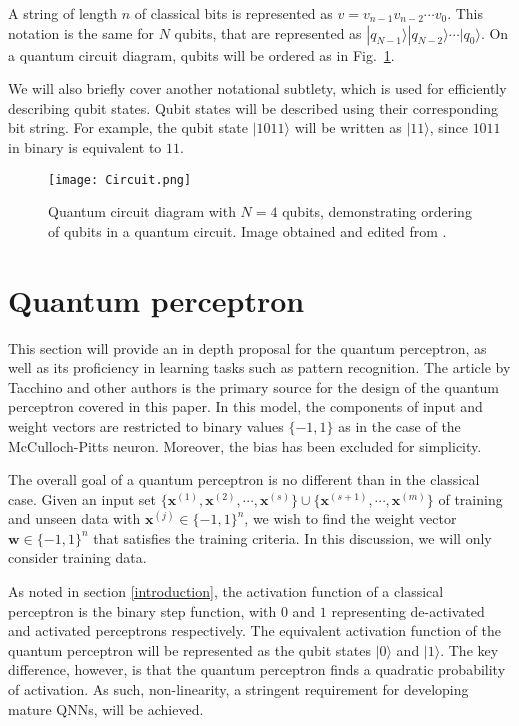\documentclass[twocolumn,superscriptaddress]{revtex4-1}
\begin{document}
A string of length $n$ of classical bits is represented as $v = v_{n-1} v_{n-2} \cdots v_0$. This notation is the same for $N$ qubits, that are represented as $|q_{N-1} \rangle | q_{N-2} \rangle \cdots |q_0 \rangle$. On a quantum circuit diagram, qubits will be ordered as in Fig.~\ref{fig:Circuit}.

We will also briefly cover another notational subtlety, which is used for efficiently describing qubit states. Qubit states will be described using their corresponding bit string. For example, the qubit state $|1011 \rangle$ will be written as $|11 \rangle$, since $1011$ in binary is equivalent to $11$.

\begin{figure}[t!]
\texttt{[image: Circuit.png]}
\caption{Quantum circuit diagram with $N = 4$ qubits, demonstrating ordering of qubits in a quantum circuit. Image obtained and edited from \cite{Inaki2024}.}
\label{fig:Circuit}
\end{figure}

\section{Quantum perceptron} \label{quantum perceptron}

This section will provide an in depth proposal for the quantum perceptron, as well as its proficiency in learning tasks such as pattern recognition. The article \cite{Tacchino_2019} by Tacchino and other authors is the primary source for the design of the quantum perceptron covered in this paper. In this model, the components of input and weight vectors are restricted to binary values $\{-1, 1\}$ as in the case of the McCulloch-Pitts neuron. Moreover, the bias has been excluded for simplicity.

The overall goal of a quantum perceptron is no different than in the classical case. Given an input set $\{\bm{x}^{(1)}, \bm{x}^{(2)}, \cdots, \bm{x}^{(s)}\} \cup \{ \bm{x}^{({s+1})}, \cdots , \bm{x}^{(m)} \}$  of training and unseen data with $\bm{x}^{(j)} \in {\{-1, 1\}}^n$, we wish to find the weight vector $\bm{w} \in {\{-1, 1\}}^n$ that satisfies the training criteria. In this discussion, we will only consider training data.

As noted in section \ref{introduction}, the activation function of a classical perceptron is the binary step function, with $0$ and $1$ representing de-activated and activated perceptrons respectively. The equivalent activation function of the quantum perceptron will be represented as the qubit states $|0 \rangle$ and $| 1 \rangle$. The key difference, however, is that the quantum perceptron finds a quadratic probability of activation. As such, non-linearity, a stringent requirement for developing mature QNNs, will be achieved.
\end{document}

